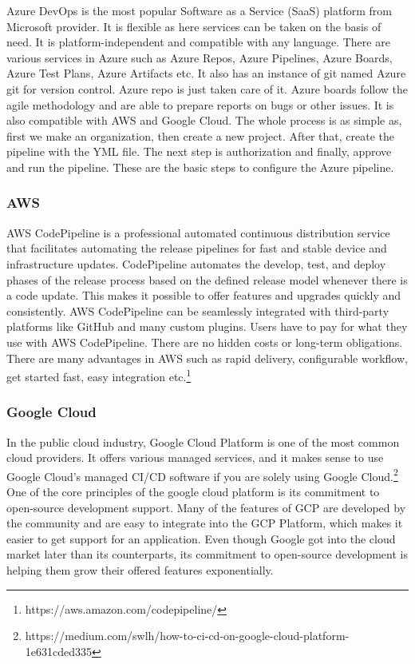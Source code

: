 Azure DevOps is the most popular Software as a Service (SaaS) platform from Microsoft provider. It is flexible as here services can be taken on the basis of need. It is platform-independent and compatible with any language. There are various services in Azure such as Azure Repos, Azure Pipelines, Azure Boards, Azure Test Plans, Azure Artifacts etc. It also has an instance of git named Azure git for version control. Azure repo is just taken care of it. Azure boards follow the agile methodology and are able to prepare reports on bugs or other issues. It is also compatible with AWS and Google Cloud. The whole process is as simple as, first we make an organization, then create a new project. After that, create the pipeline with the YML file. The next step is authorization and finally, approve and run the pipeline. These are the basic steps to configure the Azure pipeline.

%
\subsubsection{AWS}
%

AWS CodePipeline is a professional automated continuous distribution service that facilitates automating the release pipelines for fast and stable device and infrastructure updates. CodePipeline automates the develop, test, and deploy phases of the release process based on the defined release model whenever there is a code update. This makes it possible to offer features and upgrades quickly and consistently. AWS CodePipeline can be seamlessly integrated with third-party platforms like GitHub and many custom plugins. Users have to pay for what they use with AWS CodePipeline. There are no hidden costs or long-term obligations. There are many advantages in AWS such as rapid delivery, configurable workflow, get started fast, easy integration etc.\footnote{https://aws.amazon.com/codepipeline/}


%

\subsubsection{Google Cloud}
%
In the public cloud industry, Google Cloud Platform is one of the most common cloud providers. It offers various managed services, and it makes sense to use Google Cloud's managed CI/CD software if you are solely using Google Cloud.\footnote{https://medium.com/swlh/how-to-ci-cd-on-google-cloud-platform-1e631cded335} One of the core principles of the google cloud platform is its commitment to open-source development support. Many of the features of GCP are developed by the community and are easy to integrate into the GCP Platform, which makes it easier to get support for an application. Even though Google got into the cloud market later than its counterparts, its commitment to open-source development is helping them grow their offered features exponentially.  
%

